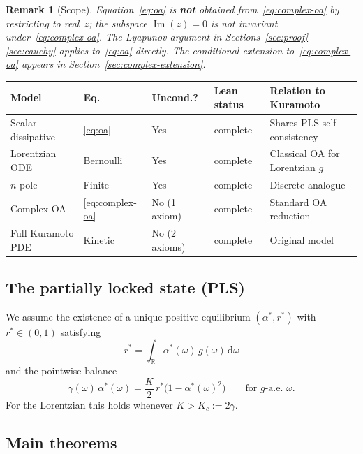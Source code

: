 \documentclass[11pt,a4paper]{article}
\newtheorem{remark}[theorem]{Remark}
\theoremstyle{definition}
\DeclareMathOperator{\im}{Im}
\newcommand{\R}{\mathbb{R}}
\begin{document}
\begin{remark}[Scope]\label{rem:scope}
Equation~\eqref{eq:oa} is \textbf{not} obtained from~\eqref{eq:complex-oa} by restricting to real~$z$; the subspace $\im(z)=0$ is not invariant under~\eqref{eq:complex-oa}. The Lyapunov argument in Sections~\ref{sec:proof}--\ref{sec:cauchy} applies to~\eqref{eq:oa} directly. The conditional extension to~\eqref{eq:complex-oa} appears in Section~\ref{sec:complex-extension}.
\end{remark}

\begin{center}\small
\begin{tabular}{@{}lllll@{}}
\textbf{Model} & \textbf{Eq.} & \textbf{Uncond.?} & \textbf{Lean status} & \textbf{Relation to Kuramoto} \\
\hline
Scalar dissipative & \eqref{eq:oa} & Yes & complete & Shares PLS self-consistency \\
Lorentzian ODE & Bernoulli & Yes & complete & Classical OA for Lorentzian $g$ \\
$n$-pole & Finite & Yes & complete & Discrete analogue \\
Complex OA & \eqref{eq:complex-oa} & No (1 axiom) & complete & Standard OA reduction \\
Full Kuramoto PDE & Kinetic & No (2 axioms) & complete & Original model \\
\end{tabular}
\end{center}

\subsection{The partially locked state (PLS)}

We assume the existence of a unique positive equilibrium $(\alpha^*,r^*)$ with $r^*\in(0,1)$ satisfying
\begin{equation}\label{eq:sc}
r^* = \int_\R \alpha^*(\omega)\,g(\omega)\,\mathrm{d}\omega
\end{equation}
and the pointwise balance
\begin{equation}\label{eq:equil}
\gamma(\omega)\,\alpha^*(\omega) = \frac{K}{2}\,r^*\bigl(1 - \alpha^*(\omega)^2\bigr) \qquad \text{for $g$-a.e.\ $\omega$.}
\end{equation}
For the Lorentzian this holds whenever $K>K_c := 2\gamma$.

\subsection{Main theorems}
\end{document}
